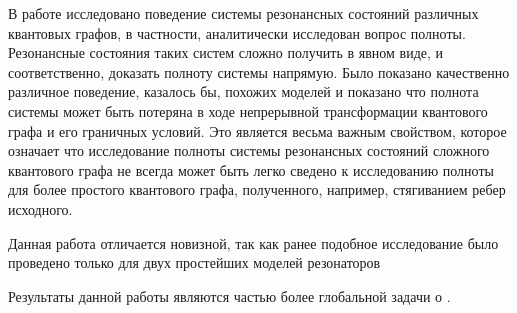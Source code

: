 \startconclusionpage

В работе исследовано поведение системы резонансных состояний различных квантовых графов, в частности, аналитически исследован вопрос полноты. Резонансные состояния таких систем сложно получить в явном виде, и соответственно, доказать полноту системы напрямую. Было показано качественно различное поведение, казалось бы, похожих моделей и показано что полнота системы может быть потеряна в ходе непрерывной трансформации квантового графа и его граничных условий. Это является весьма важным свойством, которое означает что исследование полноты системы резонансных состояний сложного квантового графа не всегда может быть легко сведено к исследованию полноты для более простого квантового графа, полученного, например, стягиванием ребер исходного. 

Данная работа отличается новизной, так как ранее подобное исследование было проведено только для двух простейших моделей резонаторов  

Результаты данной работы являются частью более глобальной задачи о .